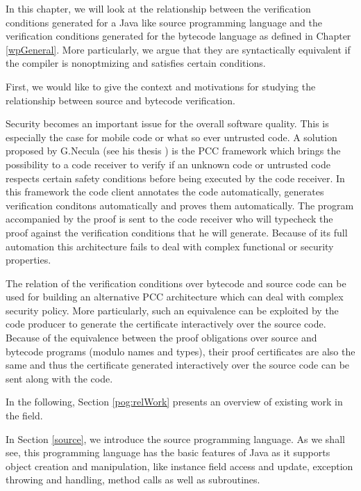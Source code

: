 

In this chapter, we will look at the relationship between
the verification conditions generated for a Java like source programming 
language and the verification conditions generated for the bytecode language 
as defined in Chapter \ref{wpGeneral}. More particularly, we 
argue that they are syntactically equivalent if the compiler is nonoptmizing and satisfies certain 
conditions.
  

First, we would like to give the 
context and motivations for studying the relationship 
between source and bytecode verification.


 Security becomes an important issue for the overall software quality.
This is especially the case for mobile code or what so ever untrusted code. 
A solution  proposed by G.Necula (see his thesis \cite{ComNec}) 
is the PCC framework which brings the possibility to a  code receiver to 
verify if an unknown code  or untrusted code respects certain safety conditions before being executed by the code receiver.
In this framework the code client annotates the code automatically, generates verification conditons automatically
 and proves them automatically.
The  program accompanied by the proof  is sent to the code receiver  who will typecheck the proof against 
the verification conditions that he will generate.
Because of its full automation this architecture fails to deal with complex functional or security properties.


The relation of the verification conditions over bytecode and source code can be used for building an
 alternative PCC architecture which can deal with complex security policy. 
More particularly, such an equivalence can be exploited by the code producer to generate
 the certificate interactively over the source code. Because of the
equivalence between the proof obligations over source and bytecode programs (modulo names and types), 
their  proof certificates are also the same and thus the certificate generated interactively over the
 source code can be sent along with the code.   




In the following, Section \ref{pog:relWork} presents an overview of existing work in the field.

 In Section \ref{source},  we introduce the source programming language. As we shall see,
this programming language has the basic features of Java as it supports object creation and manipulation, like instance 
field access and  update, 
 exception throwing and handling, method calls as well as subroutines.

